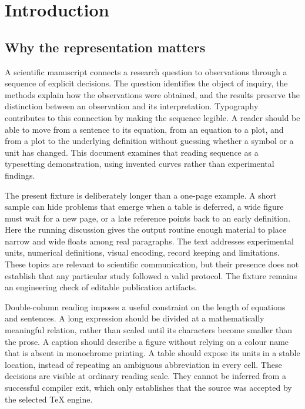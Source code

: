 \section{Introduction}
\subsection{Why the representation matters}
A scientific manuscript connects a research question to observations through a sequence of explicit decisions. The question identifies the object of inquiry, the methods explain how the observations were obtained, and the results preserve the distinction between an observation and its interpretation. Typography contributes to this connection by making the sequence legible. A reader should be able to move from a sentence to its equation, from an equation to a plot, and from a plot to the underlying definition without guessing whether a symbol or a unit has changed. This document examines that reading sequence as a typesetting demonstration, using invented curves rather than experimental findings.

The present fixture is deliberately longer than a one-page example. A short sample can hide problems that emerge when a table is deferred, a wide figure must wait for a new page, or a late reference points back to an early definition. Here the running discussion gives the output routine enough material to place narrow and wide floats among real paragraphs. The text addresses experimental units, numerical definitions, visual encoding, record keeping and limitations. These topics are relevant to scientific communication, but their presence does not establish that any particular study followed a valid protocol. The fixture remains an engineering check of editable publication artifacts.

Double-column reading imposes a useful constraint on the length of equations and sentences. A long expression should be divided at a mathematically meaningful relation, rather than scaled until its characters become smaller than the prose. A caption should describe a figure without relying on a colour name that is absent in monochrome printing. A table should expose its units in a stable location, instead of repeating an ambiguous abbreviation in every cell. These decisions are visible at ordinary reading scale. They cannot be inferred from a successful compiler exit, which only establishes that the source was accepted by the selected TeX engine.

